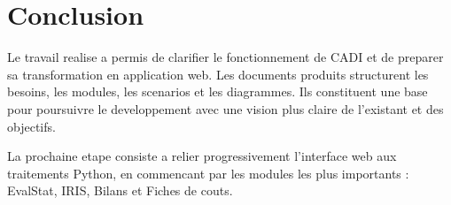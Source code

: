 \documentclass[11pt,a4paper]{report}
\begin{document}
\chapter{Conclusion}

Le travail realise a permis de clarifier le fonctionnement de CADI et de preparer sa transformation en application web. Les documents produits structurent les besoins, les modules, les scenarios et les diagrammes. Ils constituent une base pour poursuivre le developpement avec une vision plus claire de l'existant et des objectifs.

La prochaine etape consiste a relier progressivement l'interface web aux traitements Python, en commencant par les modules les plus importants : EvalStat, IRIS, Bilans et Fiches de couts.
\end{document}
